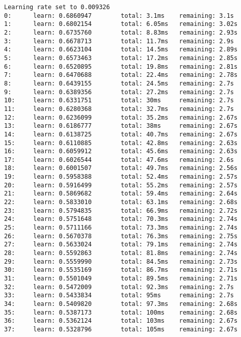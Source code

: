 \documentclass[11pt]{article}
\begin{document}
    \begin{Verbatim}[commandchars=\\\{\}]
Learning rate set to 0.009326
0:      learn: 0.6860947        total: 3.1ms    remaining: 3.1s
1:      learn: 0.6802154        total: 6.05ms   remaining: 3.02s
2:      learn: 0.6735760        total: 8.83ms   remaining: 2.93s
3:      learn: 0.6678713        total: 11.7ms   remaining: 2.9s
4:      learn: 0.6623104        total: 14.5ms   remaining: 2.89s
5:      learn: 0.6573463        total: 17.2ms   remaining: 2.85s
6:      learn: 0.6520895        total: 19.8ms   remaining: 2.81s
7:      learn: 0.6470688        total: 22.4ms   remaining: 2.78s
8:      learn: 0.6439155        total: 24.5ms   remaining: 2.7s
9:      learn: 0.6389356        total: 27.2ms   remaining: 2.7s
10:     learn: 0.6331751        total: 30ms     remaining: 2.7s
11:     learn: 0.6280368        total: 32.7ms   remaining: 2.7s
12:     learn: 0.6236099        total: 35.2ms   remaining: 2.67s
13:     learn: 0.6186777        total: 38ms     remaining: 2.67s
14:     learn: 0.6138725        total: 40.7ms   remaining: 2.67s
15:     learn: 0.6110885        total: 42.8ms   remaining: 2.63s
16:     learn: 0.6059912        total: 45.6ms   remaining: 2.63s
17:     learn: 0.6026544        total: 47.6ms   remaining: 2.6s
18:     learn: 0.6001507        total: 49.7ms   remaining: 2.56s
19:     learn: 0.5958388        total: 52.4ms   remaining: 2.57s
20:     learn: 0.5916499        total: 55.2ms   remaining: 2.57s
21:     learn: 0.5869682        total: 59.4ms   remaining: 2.64s
22:     learn: 0.5833010        total: 63.1ms   remaining: 2.68s
23:     learn: 0.5794835        total: 66.9ms   remaining: 2.72s
24:     learn: 0.5751648        total: 70.3ms   remaining: 2.74s
25:     learn: 0.5711166        total: 73.3ms   remaining: 2.74s
26:     learn: 0.5670378        total: 76.3ms   remaining: 2.75s
27:     learn: 0.5633024        total: 79.1ms   remaining: 2.74s
28:     learn: 0.5592863        total: 81.8ms   remaining: 2.74s
29:     learn: 0.5559990        total: 84.5ms   remaining: 2.73s
30:     learn: 0.5535169        total: 86.7ms   remaining: 2.71s
31:     learn: 0.5501049        total: 89.5ms   remaining: 2.71s
32:     learn: 0.5472009        total: 92.3ms   remaining: 2.7s
33:     learn: 0.5433834        total: 95ms     remaining: 2.7s
34:     learn: 0.5409820        total: 97.3ms   remaining: 2.68s
35:     learn: 0.5387173        total: 100ms    remaining: 2.68s
36:     learn: 0.5362124        total: 103ms    remaining: 2.67s
37:     learn: 0.5328796        total: 105ms    remaining: 2.67s

\end{Verbatim}
\end{document}
